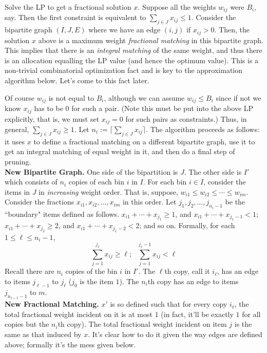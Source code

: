 \documentclass[11pt]{article}
\def\ceil#1{\lceil {#1} \rceil}
\begin{document}
Solve the LP to get a fractional solution $x$. Suppose all the weights $w_{ij}$ were $B_i$, say. Then the first constraint is equivalent to $\sum_{j\in J} x_{ij} \le 1$. Consider the bipartite graph $(I,J,E)$ where we have an edge $(i,j)$ if $x_{ij} > 0$. Then, the solution $x$ above is a maximum weight {\em fractional matching} in this bipartite graph. This implies that there is an {\em integral matching} of the same weight, and thus there is an allocation equalling the LP value (and hence the optimum value). This is a non-trivial combinatorial optimization fact and is key to the approximation algorithm below. Let's come to this fact later. 

Of course $w_{ij}$ is not equal to $B_i$, although we can assume $w_{ij} \le B_i$ since if not we know $x_{ij}$
has to be $0$ for such a pair. (Note this must be put into the above LP explicitly, that is, we must set $x_{ij} = 0$ for such pairs as constraints.) Thus, in general, $\sum_{j\in J} x_{ij} \ge 1$. Let $n_i := \ceil{\sum_{j\in J}x_{ij}}$. The algorithm proceeds as follows: it uses $x$ to define a fractional matching on a different bipartite graph, use it to get an integral matching of equal weight in it, and then do a final step of pruning.  \\

\noindent
{\bf New Bipartite Graph.} One side of the bipartition is $J$. The other side is $I'$ which consists of $n_i$ copies of each bin $i$ in $I$. For each bin $i\in I$, consider the items in $J$ in {\em increasing} weight order.
That is, suppose, $w_{i1} \le w_{i2} \le \cdots \le w_{im}$. Consider the fractions $x_{i1},x_{i2},\ldots,x_{im}$ in this order. Let $j_1,j_2,\ldots,j_{n_i-1}$ be the ``boundary" items defined as follows. $x_{i1} + \cdots + x_{j_1} \ge 1$, and $x_{i1} + \cdots + x_{j_1 - 1} < 1$; $x_{i1} + \cdots + x_{j_2} \ge 2$, and $x_{i1} + \cdots + x_{j_1 - 2} < 2$; and so on. Formally, for each $1 \le \ell \le n_i-1$,
$$ \sum_{j=1}^{j_{\ell}} x_{ij} \ge \ell; ~~~ \sum_{j=1}^{j_{\ell}-1} x_{ij} < \ell$$
Recall there are $n_i$ copies of the bin $i$ in $I'$. The $\ell$th copy, call it $i_\ell$, has an edge to items $j_{\ell - 1}$ to $j_{\ell}$ ($j_0$ is the item $1$). The $n_i$th copy has an edge to items $j_{n_{i-1}-1}$ to $m$. \\

\noindent
{\bf New Fractional Matching.} $x'$ is so defined such that for every copy $i_\ell$, the total fractional weight incident on it is at most $1$ (in fact, it'll be exactly $1$ for all copies but the $n_i$th copy). The total fractional weight incident on item $j$ is the same as that induced by $x$. It's clear how to do it given the way edges are defined above; formally it's the mess given below.
\end{document}
